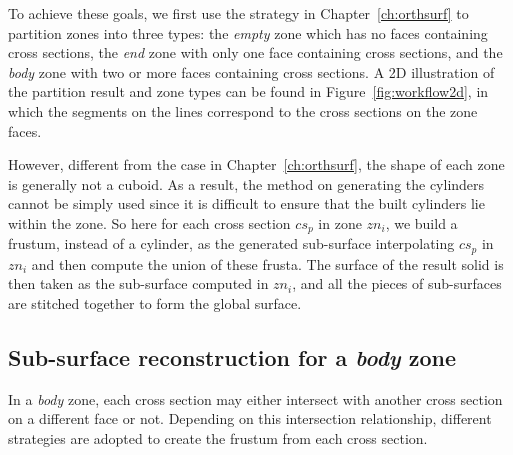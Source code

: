 To achieve these goals, we first use the strategy in
Chapter~\ref{ch:orthsurf} to partition zones into three types: the
\textit{empty} zone which has no faces containing cross sections,
the \textit{end} zone with only one face containing cross sections,
and the \textit{body} zone with two or more faces containing cross
sections. A 2D illustration of the partition result and zone types
can be found in Figure~\ref{fig:workflow2d}, in which the segments
on the lines correspond to the cross sections on the zone faces.

However, different from the case in  Chapter~\ref{ch:orthsurf}, the
shape of each zone is generally not a cuboid. As a result, the
method on generating the cylinders cannot be simply used since it is
difficult to ensure that the built cylinders lie within the zone. So
here for each cross section $cs_p$ in zone $zn_i$, we build a
frustum, instead of a cylinder, as the generated sub-surface
interpolating $cs_p$ in $zn_i$ and then compute the union of these
frusta. The surface of the result solid is then taken as the
sub-surface computed in $zn_i$, and all the pieces of sub-surfaces
are stitched together to form the global surface.



\subsection{Sub-surface reconstruction for a \textit{body} zone}
\label{ch6:sec:reconst:body}

In a \textit{body} zone, each cross  section may either intersect
with another cross section on a different face or not. Depending on
this intersection relationship, different strategies are adopted to
create the frustum from each cross section.

